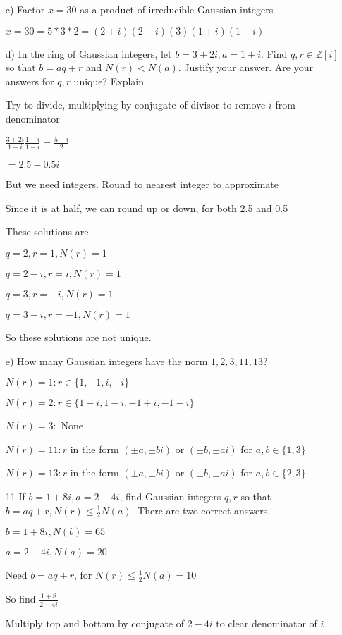\documentclass[12pt]{article}
\begin{document}
\begin{itemize}
		c) Factor $x = 30$ as a product of irreducible Gaussian integers

		$x = 30 = 5 * 3 * 2 = (2 + i)(2-i)(3)(1+i)(1-i)$

		d) In the ring of Gaussian integers, let $b = 3 + 2i, a = 1+ i$. Find $q,r \in \mathbb{Z}[i]$ so that $b = aq + r$ and $N(r) < N(a)$. Justify your answer. Are your answers for $q,r$ unique? Explain

		Try to divide, multiplying by conjugate of divisor to remove $i$ from denominator

		$\frac{3+2i}{1+i} \frac{1-i}{1-i} = \frac{5-i}{2}$

		$ = 2.5 - 0.5i$

		But we need integers. Round to nearest integer to approximate

		Since it is at half, we can round up or down, for both 2.5 and 0.5

		These solutions are 
		
		$q = 2, r = 1, N(r) = 1$
		
		$q = 2 -i, r = i, N(r) = 1$
		
		$q = 3, r = -i, N(r) = 1$
		
		$q= 3- i, r = -1, N(r) = 1$
	
		So these solutions are not unique.

		e) How many Gaussian integers have the norm $1,2,3,11,13$?

		$N(r) = 1: r \in \{1, -1, i, -i\}$

		$N(r) = 2: r \in \{1+i, 1-i, -1+i, -1 - i\}$

		$N(r) = 3:$ None

		$N(r) = 11: r$ in the form $(\pm a, \pm b i)$ or $(\pm b, \pm a i)$ for $a,b \in \{1, 3\}$

		$N(r) = 13: r$ in the form $(\pm a, \pm b i)$ or $(\pm b, \pm a i)$ for $a,b \in \{2, 3\}$

	\item[11] If $b = 1 + 8i, a = 2-4i$, find Gaussian integers $q,r$ so that $b = aq + r, N(r) \leq \frac{1}{2} N(a)$. There are two correct answers.

		$b = 1 + 8i, N(b) = 65$

		$a = 2 - 4i, N(a) = 20$

		Need $b = aq + r$, for $N(r) \leq \frac{1}{2} N(a) = 10$

		So find $\frac{1+8}{2-4i}$

		Multiply top and bottom by conjugate of $2-4i$ to clear denominator of $i$


\end{itemize}
\end{document}

